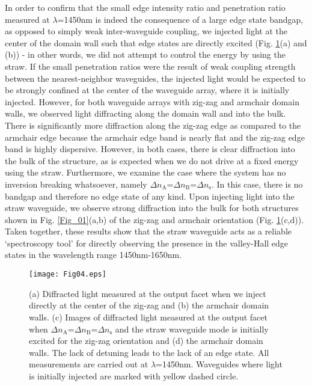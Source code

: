 \documentclass[prl,twocolumn,showpacs,amsmath,amssymb,superscriptaddress]{revtex4-1}
\begin{document}
In order to confirm that the small edge intensity ratio and penetration ratio measured at $\lambda$=1450nm is indeed the consequence of a large edge state bandgap, as opposed to simply weak inter-waveguide coupling, we injected light at the center of the domain wall such that edge states are directly excited (Fig. \ref{Fig_04}(a) and (b)) - in other words, we did not attempt to control the energy by using the straw.
If the small penetration ratios were the result of weak coupling strength between the nearest-neighbor waveguides, the injected light would be expected to be strongly confined at the center of the waveguide array, where it is initially injected.
However, for both waveguide arrays with zig-zag and armchair domain walls, we observed light diffracting along the domain wall and into the bulk.
There is significantly more diffraction along the zig-zag edge as compared to the armchair edge because the armchair edge band is nearly flat and the zig-zag edge band is highly dispersive.
However, in both cases, there is clear diffraction into the bulk of the structure, as is expected when we do not drive at a fixed energy using the straw.
Furthermore, we examine the case where the system has no inversion breaking whatsoever, namely $\Delta n_{\textrm{A}}$=$\Delta n_{\textrm{B}}$=$\Delta n_{\textrm{s}}$.
In this case, there is no bandgap and therefore no edge state of any kind.
Upon injecting light into the straw waveguide, we observe strong diffraction into the bulk for both structures shown in Fig. \ref{Fig_01}(a,b) of the zig-zag and armchair orientation (Fig. \ref{Fig_04}(c,d)).
Taken together, these results show that the straw waveguide acts as a reliable `spectroscopy tool' for directly observing the presence in the valley-Hall edge states in the wavelength range 1450nm-1650nm.    

\begin{figure}[htbp]
	\centering
	\texttt{[image: Fig04.eps]}
	\caption{(a) Diffracted light measured at the output facet when we inject directly at the center of the zig-zag and (b) the armchair domain walls. (c) Images of diffracted light measured at the output facet when $\Delta n_{\textrm{A}}$=$\Delta n_{\textrm{B}}$=$\Delta n_{\textrm{s}}$ and the straw waveguide mode is initially excited for the zig-zag orientation and (d) the armchair domain walls.  The lack of detuning leads to the lack of an edge state.  All measurements are carried out at $\lambda$=1450nm. Waveguides where light is initially injected are marked with yellow dashed circle.}
	\label{Fig_04}
\end{figure}
\end{document}
